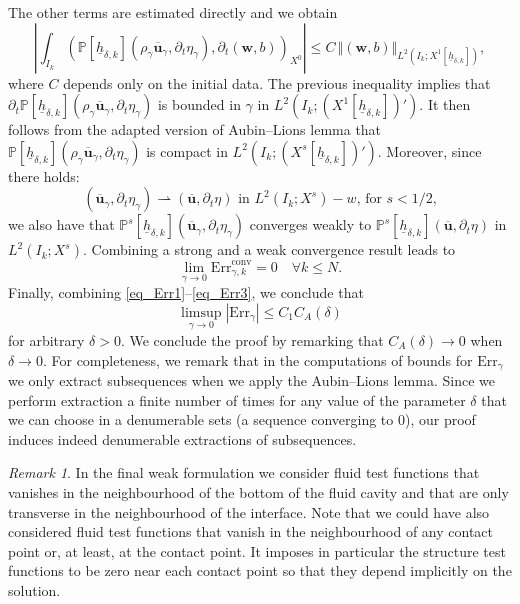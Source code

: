 \documentclass[10pt]{amsart}
\newcommand{\conv}{\mathrm{conv}}
\newcommand{\Err}{\mathrm{Err}}
\theoremstyle{remark}
\newtheorem{remark}[theorem]{Remark}
\theoremstyle{definition}
\newcommand{\norme}[1]{\,\Vert #1\Vert}
\newcommand{\ug}{\boldsymbol{u}}
\newcommand{\wg}{\boldsymbol{w}}
\newcommand{\hb}{{\underline{h}}}
\begin{document}
The other terms are estimated directly and we obtain
\[
\left\vert \int_{I_{k}}\left( \mathbb{P}[\hb_{\delta, k}](\rho_{\gamma}\overline{\ug}_{\gamma},\partial_{t}\eta_{\gamma}), \partial_{t}(\wg,b) \right)_{X^0}\right\vert \leq C\norme{(\wg,b)}_{L^{2}(I_{k};X^{1}[\hb_{\delta, k}])},
\]
where $C$ depends only on the initial data.
The previous inequality implies that $\partial_{t}\mathbb{P}[\hb_{\delta, k}](\rho_{\gamma}\overline{\ug}_{\gamma},\partial_{t}\eta_{\gamma})$ is bounded in $\gamma$ in $L^{2}(I_{k};(X^{1}[\hb_{\delta, k}])')$. It then follows from the adapted version of Aubin--Lions lemma that $\mathbb{P}[\hb_{\delta, k}](\rho_{\gamma}\overline{\ug}_{\gamma},\partial_{t}\eta_{\gamma})$ is compact in $L^{2}(I_{k};(X^{s}[\hb_{\delta, k}])')$. Moreover, since there holds:
\[
(\overline{\ug}_{\gamma},\partial_t \eta_{\gamma}) \rightharpoonup (\overline{\ug},\partial_t \eta) \text{ in $L^2(I_k; X^s)-w$, for $s<1/2$,}
\]
we also have that
$\mathbb P^s[\hb_{\delta,k}](\overline{\ug}_{\gamma},\partial_t \eta_{\gamma})$ converges weakly to $\mathbb P^s[\hb_{\delta,k}](\overline{\ug},\partial_t \eta)$ in $L^2(I_k;X^s)$. Combining a strong and a weak convergence result leads to
\begin{equation} \label{eq_Err3}
\lim_{\gamma \to 0} \Err_{\gamma,k}^{\conv} = 0 \quad \forall k \leq N.
\end{equation}
Finally, combining \eqref{eq_Err1}--\eqref{eq_Err3}, we conclude that
\[
\limsup_{\gamma \to 0} |\Err_{\gamma} | \leq C_1C_A(\delta)
\]
for arbitrary $\delta >0$. We conclude the proof by remarking that $C_A(\delta) \to 0$ when $\delta \to 0$. For completeness, we remark that in the computations of bounds for $\Err_{\gamma}$ we only extract subsequences when we apply the Aubin--Lions lemma. Since we perform extraction a finite number of times for any value of the parameter $\delta$ that we can choose in a denumerable sets (\ie a sequence converging to $0$), our proof induces indeed denumerable extractions of subsequences.

\begin{remark} \label{rem:testfunction}
In the final weak formulation we consider fluid test functions that vanishes in the neighbourhood of the bottom of the fluid cavity and that are only transverse in the neighbourhood of the interface. Note that we could have also considered fluid test functions that vanish in the neighbourhood of any contact point or, at least, at the contact point. It imposes in particular the structure test functions to be zero near each contact point so that they depend implicitly on the solution.
\end{remark}
\end{document}
